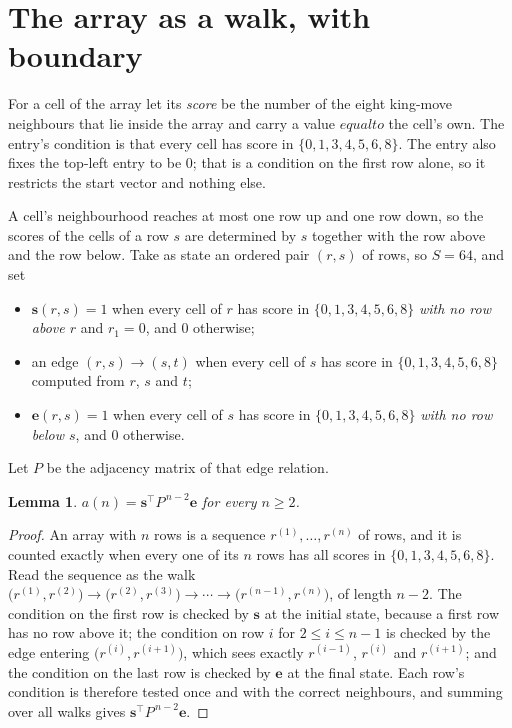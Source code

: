 \documentclass[11pt,a4paper]{article}
\theoremstyle{plain}
\newtheorem{lemma}[theorem]{Lemma}
\theoremstyle{definition}
\begin{document}
\section{The array as a walk, with boundary}

For a cell of the array let its \emph{score} be the number of the eight king-move neighbours that lie inside
the array and carry a value $equal to$ the cell's own. The entry's condition is that every cell
has score in $\{0,1,3,4,5,6,8\}$. The entry also fixes the top-left entry to be $0$; that is a condition on the first row alone, so it restricts the start vector and nothing else.

A cell's neighbourhood reaches at most one row up and one row down, so the scores of the
cells of a row $s$ are determined by $s$ together with the row above and the row below.
Take as state an ordered pair $(r,s)$ of rows, so $S=64$, and set
\begin{itemize}
\item $\mathbf{s}(r,s)=1$ when every cell of $r$ has score in $\{0,1,3,4,5,6,8\}$ \emph{with no row
above $r$} and $r_1=0$, and $0$ otherwise;
\item an edge $(r,s)\to(s,t)$ when every cell of $s$ has score in $\{0,1,3,4,5,6,8\}$ computed from
$r$, $s$ and $t$;
\item $\mathbf{e}(r,s)=1$ when every cell of $s$ has score in $\{0,1,3,4,5,6,8\}$ \emph{with no row
below $s$}, and $0$ otherwise.
\end{itemize}
Let $P$ be the adjacency matrix of that edge relation.

\begin{lemma}\label{lem:walk}
$a(n)=\mathbf{s}^{\!\top}P^{\,n-2}\mathbf{e}$ for every $n\ge2$.
\end{lemma}

\begin{proof}
An array with $n$ rows is a sequence $r^{(1)},\dots,r^{(n)}$ of rows, and it is counted
exactly when every one of its $n$ rows has all scores in $\{0,1,3,4,5,6,8\}$. Read the sequence as the
walk $\bigl(r^{(1)},r^{(2)}\bigr)\to\bigl(r^{(2)},r^{(3)}\bigr)\to\cdots\to
\bigl(r^{(n-1)},r^{(n)}\bigr)$, of length $n-2$. The condition on the first row is
checked by $\mathbf{s}$ at the initial state, because a first row has no row above it; the
condition on row $i$ for $2\le i\le n-1$ is checked by the edge entering
$\bigl(r^{(i)},r^{(i+1)}\bigr)$, which sees exactly $r^{(i-1)}$, $r^{(i)}$ and
$r^{(i+1)}$; and the condition on the last row is checked by $\mathbf{e}$ at the final
state. Each row's condition is therefore tested once and with the correct neighbours, and
summing over all walks gives $\mathbf{s}^{\!\top}P^{\,n-2}\mathbf{e}$.
\end{proof}
\end{document}
